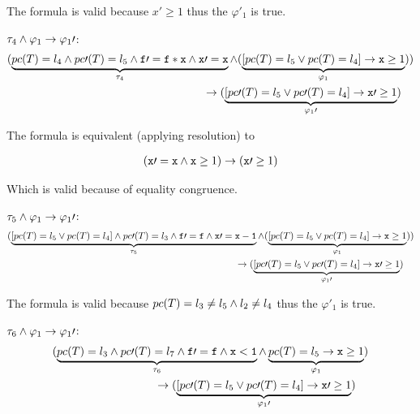 		The formula is valid because $x\prime \geq 1$ thus the $\varphi\prime _1$ is true.

	 \;$\tau_4 \wedge \varphi_1 \to \varphi_1\prime $: 
	\begin{align*}
		(
			\underbrace{pc(T) = l_4 \wedge pc\prime (T) = l_5 \wedge \mathtt{f}\prime  = \mathtt{f*x} \wedge \mathtt{x\prime =x}}_{\tau_4} \wedge (\underbrace{[pc(T) = l_5 \vee pc(T) = l_4 ] \to \mathtt{x}\geq 1}_{\varphi_1})
		) \\
			\to(\underbrace{[pc\prime (T) = l_5 \vee pc\prime(T) = l_4] \to \mathtt{x}\prime  \geq 1}_{\varphi_1\prime })\;\;\;\;
	\end{align*}

	The formula is equivalent (applying resolution) to

	\begin{align*}
		(
			\mathtt{x\prime =x} \wedge  \mathtt{x}\geq 1
		) 
		\to (\mathtt{x}\prime \geq 1)
	\end{align*}


	Which is valid because of equality congruence.

	 $\tau_5 \wedge \varphi_1 \to \varphi_1\prime $:
	\begin{align*}
		(
			\underbrace{[pc(T) = l_5 \vee pc(T) = l_4 ]\wedge pc\prime (T) = l_3 \wedge \mathtt{f\prime =f} \wedge \mathtt{x\prime =x-1}}_{\tau_5} \wedge (\underbrace{[pc(T) = l_5 \vee pc(T) = l_4 ] \to \mathtt{x}\geq 1}_{\varphi_1})
		) \\
			\to(\underbrace{[pc\prime (T) = l_5 \vee pc\prime(T) = l_4] \to \mathtt{x}\prime  \geq 1}_{\varphi_1\prime })\;\;\;\;
	\end{align*}


	The formula is valid because $pc(T) = l_3 \neq l_5 \wedge l_2 \neq l_4$ thus the $\varphi\prime _1$ is true.

	 $\tau_6 \wedge \varphi_1 \to \varphi_1\prime $:
	\begin{align*}
		(
			\underbrace{pc(T) = l_3 \wedge pc\prime (T) = l_7 \wedge \mathtt{f\prime =f} \wedge \mathtt{x<1}}_{\tau_6} \wedge \underbrace{pc(T) = l_5 \to \mathtt{x} \geq 1}_{\varphi_1}
		) \\
			\to (\underbrace{[pc\prime (T) = l_5 \vee pc\prime(T) = l_4] \to \mathtt{x}\prime  \geq 1}_{\varphi_1\prime })\;\;\;\;
	\end{align*}


